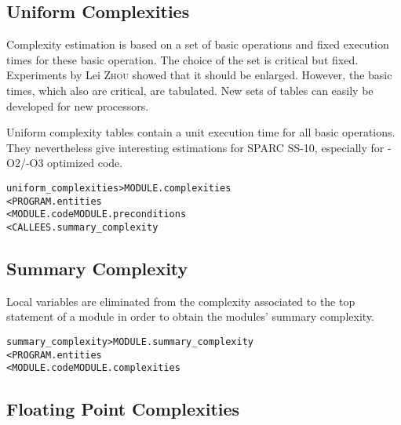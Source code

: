 \documentclass[a4paper]{report}
\newenvironment{PipsMake}{\begin{alltt}}{\end{alltt}}
\newenvironment{PipsPass}[1]{\label{pass:#1}}{}
\begin{document}
\subsection{Uniform Complexities}
\label{subsubsection-uniform-complexities}

\begin{PipsPass}{uniform_complexities}
Complexity estimation is based on a set of basic operations and fixed
execution times for these basic operation. The choice of the set is
critical but fixed. Experiments by Lei \textsc{Zhou} showed that it should be
enlarged. However, the basic times, which also are critical, are
tabulated. New sets of tables can easily be developed for new
processors.

Uniform complexity tables contain a unit execution time for all basic
operations. They nevertheless give interesting estimations for SPARC
SS-10, especially for -O2/-O3 optimized code.
\end{PipsPass}

\begin{PipsMake}
uniform_complexities                    > MODULE.complexities
        < PROGRAM.entities
        < MODULE.code MODULE.preconditions
        < CALLEES.summary_complexity
\end{PipsMake}

\subsection{Summary Complexity}
\label{subsubsection-summary-complexity}

\begin{PipsPass}{summary_complexity}
Local variables are eliminated from the complexity associated to the top
statement of a module in order to obtain the modules' summary complexity.
\end{PipsPass}

\begin{PipsMake}
summary_complexity              > MODULE.summary_complexity
        < PROGRAM.entities
        < MODULE.code MODULE.complexities
\end{PipsMake}

\subsection{Floating Point Complexities}
\label{subsubsection-floating-point-complexities}
\end{document}
